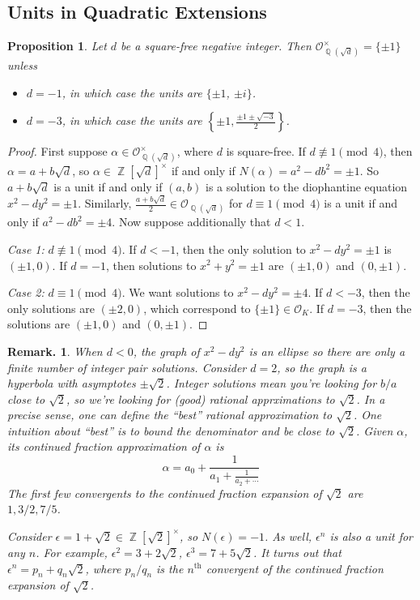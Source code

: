 \documentclass[11pt, a4paper]{memoir}
\DeclareMathOperator{\Q}{{\mathbb{Q}}}
\DeclareMathOperator{\Z}{{\mathbb{Z}}}
\theoremstyle{change}
\newtheorem{proposition}[theorem]{Proposition}
\theoremstyle{plain}
\theoremstyle{nonumberplain}
\newtheorem{remark}{Remark.}
\newtheorem{proof}{Proof}
\begin{document}
\subsection{Units in Quadratic Extensions}
\begin{proposition}
    Let $d$ be a square-free negative integer.
    Then $\mathcal{O}_{\Q(\sqrt{d})}^\times=\{\pm 1\}$ unless
    \begin{itemize}[nolistsep]
        \item $d=-1$, in which case the units are $\{\pm 1$, $\pm i\}$.
        \item $d=-3$, in which case the units are $\left\{\pm 1,\frac{\pm 1\pm\sqrt{-3}}{2}\right\}$.
    \end{itemize}
\end{proposition}
\begin{proof}
    First suppose $\alpha\in\mathcal{O}_{\Q(\sqrt{d})}^\times$, where $d$ is square-free.
    If $d\nequiv 1\pmod{4}$, then $\alpha=a+b\sqrt{d}$, so $\alpha\in\Z[\sqrt{d}]^\times$ if and only if $N(\alpha)=a^2-db^2=\pm 1$.
    So $a+b\sqrt{d}$ is a unit if and only if $(a,b)$ is a solution to the diophantine equation $x^2-dy^2=\pm1$.
    Similarly, $\frac{a+b\sqrt{d}}{2}\in\mathcal{O}_{\Q(\sqrt{d})}$ for $d\equiv 1\pmod{4}$ is a unit if and only if $a^2-db^2=\pm 4$.
    Now suppose additionally that $d<1$.

    \textit{Case 1:} $d\nequiv 1\pmod{4}$.
    If $d<-1$, then the only solution to $x^2-dy^2=\pm 1$ is $(\pm 1,0)$.
    If $d=-1$, then solutions to $x^2+y^2=\pm 1$ are $(\pm 1,0)$ and $(0,\pm 1)$.

    \textit{Case 2:} $d\equiv 1\pmod{4}$.
    We want solutions to $x^2-dy^2=\pm 4$.
    If $d<-3$, then the only solutions are $(\pm 2,0)$, which correspond to $\{\pm 1\}\in\mathcal{O}_K$.
    If $d=-3$, then the solutions are $(\pm 1,0)$ and $(0,\pm 1)$.
\end{proof}
\begin{remark}
    When $d<0$, the graph of $x^2-dy^2$ is an ellipse so there are only a finite number of integer pair solutions.
    Consider $d=2$, so the graph is a hyperbola with asymptotes $\pm\sqrt{2}$.
    Integer solutions mean you're looking for $b/a$ close to $\sqrt{2}$, so we're looking for (good) rational apprximations to $\sqrt{2}$.
    In a precise sense, one can define the ``best'' rational approximation to $\sqrt{2}$.
    One intuition about ``best'' is to bound the denominator and be close to $\sqrt{2}$.
    Given $\alpha$, its continued fraction approximation of $\alpha$ is
    \begin{equation*}
        \alpha=a_0+\frac{1}{a_1+\frac{1}{a_2+\cdots}}
    \end{equation*}
    The first few convergents to the continued fraction expansion of $\sqrt{2}$ are $1,3/2,7/5$.

    Consider $\epsilon=1+\sqrt{2}\in\Z[\sqrt{2}]^\times$, so $N(\epsilon)=-1$.
    As well, $\epsilon^n$ is also a unit for any $n$.
    For example, $\epsilon^2=3+2\sqrt{2}$, $\epsilon^3=7+5\sqrt{2}$.
    It turns out that $\epsilon^n=p_n+q_n\sqrt{2}$, where $p_n/q_n$ is the $n^\text{th}$ convergent of the continued fraction expansion of $\sqrt{2}$.
\end{remark}
\end{document}
